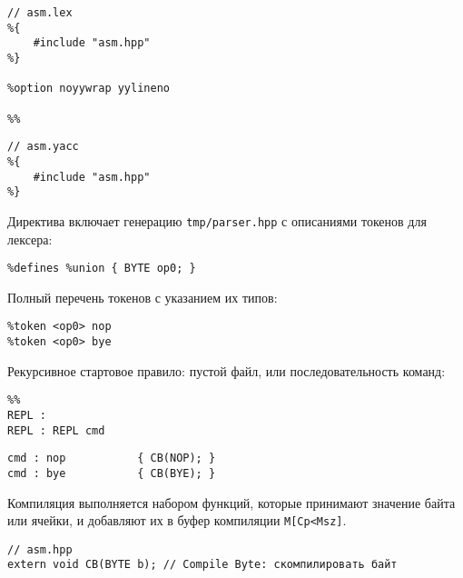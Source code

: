 \begin{verbatim}// asm.lex
%{
    #include "asm.hpp"
%}

%option noyywrap yylineno

%%
\end{verbatim}

\clearpage
{}

\begin{verbatim}// asm.yacc
%{
    #include "asm.hpp"
%}
\end{verbatim}
Директива включает генерацию \verb|tmp/parser.hpp| с описаниями токенов для лексера:
\begin{verbatim}
%defines %union { BYTE op0; }
\end{verbatim}
Полный перечень токенов с указанием их типов:
\begin{verbatim}
%token <op0> nop
%token <op0> bye
\end{verbatim}
Рекурсивное стартовое правило: пустой файл, или последовательность команд:
\begin{verbatim}
%%
REPL :
REPL : REPL cmd
\end{verbatim}
\begin{verbatim}
cmd : nop           { CB(NOP); }
cmd : bye           { CB(BYE); }
\end{verbatim}

\noindent
Компиляция выполняется набором функций, которые принимают значение байта или ячейки,
и добавляют их в буфер компиляции \verb|M[Cp<Msz]|.

\begin{verbatim}// asm.hpp
extern void CB(BYTE b); // Compile Byte: скомпилировать байт
\end{verbatim}

\secup
